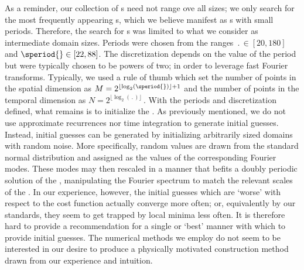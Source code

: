 As a reminder, our collection of {\po}s need not range ove all sizes;
we only search for the most frequently appearing {\fpo}s,
which we believe manifest as {\po}s with small periods. Therefore,
the search for {\po}s was limited to what we consider as intermediate domain sizes.
Periods were chosen from the ranges
$\period{}\in [20, 180]$ and $\speriod{} \in [22, 88]$. The discretization depends on
the value of the period but were typically chosen to be powers of two; in order
to leverage fast Fourier transforms. %
Typically, we used a rule of thumb which set the number of points in the
spatial dimension as $M = 2^{\lfloor\log_2(\speriod{})\rfloor + 1}$
and the number of points in the temporal dimension as
$
N = 2^{\lfloor\log_2(\period{})\rfloor}\,.
$
With the periods and discretization defined, what remains is to
initialize the {\spt} {\Fcs}.
As previously mentioned, we do not use
approximate recurrences nor time integration
to generate initial guesses.
Instead, initial guesses can be generated by initializing arbitrarily
sized domains with random noise.
More specifically, random values are drawn from the standard normal distribution
and assigned as the values of the corresponding Fourier modes.
These modes may then rescaled in a manner that befits a
doubly periodic solution of the {\KSe},
manipulating the Fourier spectrum to match the relevant scales of the \KSe.
In our experience, however, the initial guesses which are `worse' with respect
to the cost function actually converge more often; or, equivalently by our standards,
they seem to get trapped by local minima less often.
It is therefore hard to provide a recommendation for a single or `best'
manner with which to provide initial guesses. The
numerical methods we employ do not seem to be interested in our desire
to produce a physically motivated construction method
drawn from our experience and intuition.




